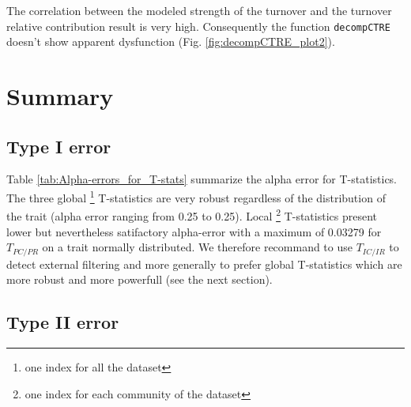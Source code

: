 \documentclass[12pt]{article}\usepackage[]{graphicx}\usepackage[]{color}
\begin{document}
The correlation between the modeled strength of the turnover and the turnover relative contribution result is very high. Consequently the function \texttt{decompCTRE} doesn't show apparent dysfunction (Fig. \ref{fig:decompCTRE_plot2}).

\cleardoublepage


\section{Summary}
\label{sect:summary}

\subsection{Type I error}

Table \ref{tab:Alpha-errors_for_T-stats} summarize the alpha error for T-statistics. The three global \footnote{one index for all the dataset} T-statistics are very robust 
regardless of the distribution of the trait (alpha error ranging from 0.25 to 0.25). Local \footnote{one index for each community of the dataset} T-statistics present lower but nevertheless satifactory alpha-error with a maximum of 0.03279 for $T_{PC/PR}$ on a trait normally distributed. We therefore recommand to use $T_{IC/IR}$ to detect external filtering and more generally to prefer global T-statistics which are more robust and more powerfull (see the next section).


\subsection{Type II error}
\end{document}
